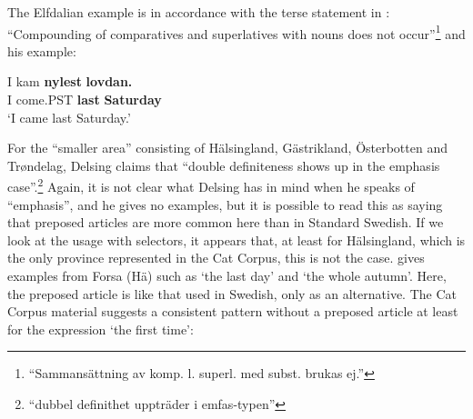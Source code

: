 
The Elfdalian example is in accordance with the terse statement in \citet[57]{Levander1909}: “Compounding of comparatives and superlatives with nouns does not occur”\footnote{ “Sammansättning av komp. l. superl. med subst. brukas ej.”} and his example:


\ea\label{}
\gll I  kam  \textbf{nylest} \textbf{lovdan.}\\
I  come.PST  \textbf{last} \textbf{Saturday}\\
\glt ‘I came last Saturday.’
\z

For the “smaller area” consisting of Hälsingland, Gästrikland, Österbotten and Trøndelag, Delsing claims that “double definiteness shows up in the emphasis case”.\footnote{ “dubbel definithet uppträder i emfas-typen” } Again, it is not clear what Delsing has in mind when he speaks of “emphasis”, and he gives no examples, but it is possible to read this as saying that preposed articles are more common here than in Standard Swedish. If we look at the usage with selectors, it appears that, at least for Hälsingland, which is the only province represented in the Cat Corpus, this is not the case. \citet[31]{Franck1995} gives examples from Forsa (Hä) such as  ‘the last day’ and  ‘the whole autumn’.  Here, the preposed article is like that used in Swedish, only as an alternative. The Cat Corpus material suggests a consistent pattern without a preposed article at least for the expression ‘the first time’:


\ea\label{}
\z
\z 
